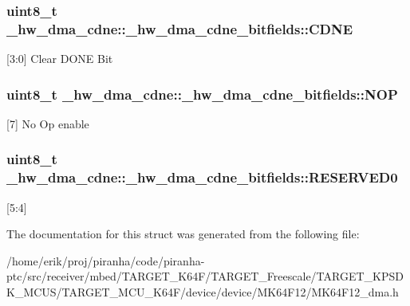 \subsubsection[{\texorpdfstring{C\+D\+NE}{CDNE}}]{\setlength{\rightskip}{0pt plus 5cm}uint8\+\_\+t \+\_\+hw\+\_\+dma\+\_\+cdne\+::\+\_\+hw\+\_\+dma\+\_\+cdne\+\_\+bitfields\+::\+C\+D\+NE}\hypertarget{struct__hw__dma__cdne_1_1__hw__dma__cdne__bitfields_ab1ddbdeb8e607e1e1ff8afd236c93c61}{}\label{struct__hw__dma__cdne_1_1__hw__dma__cdne__bitfields_ab1ddbdeb8e607e1e1ff8afd236c93c61}
\mbox{[}3\+:0\mbox{]} Clear D\+O\+NE Bit 
\subsubsection[{\texorpdfstring{N\+OP}{NOP}}]{\setlength{\rightskip}{0pt plus 5cm}uint8\+\_\+t \+\_\+hw\+\_\+dma\+\_\+cdne\+::\+\_\+hw\+\_\+dma\+\_\+cdne\+\_\+bitfields\+::\+N\+OP}\hypertarget{struct__hw__dma__cdne_1_1__hw__dma__cdne__bitfields_a2d0fc588f4e23aed9e119f61d7bb7bc4}{}\label{struct__hw__dma__cdne_1_1__hw__dma__cdne__bitfields_a2d0fc588f4e23aed9e119f61d7bb7bc4}
\mbox{[}7\mbox{]} No Op enable 
\subsubsection[{\texorpdfstring{R\+E\+S\+E\+R\+V\+E\+D0}{RESERVED0}}]{\setlength{\rightskip}{0pt plus 5cm}uint8\+\_\+t \+\_\+hw\+\_\+dma\+\_\+cdne\+::\+\_\+hw\+\_\+dma\+\_\+cdne\+\_\+bitfields\+::\+R\+E\+S\+E\+R\+V\+E\+D0}\hypertarget{struct__hw__dma__cdne_1_1__hw__dma__cdne__bitfields_a099d2094bffd7a7e67393683434dcc49}{}\label{struct__hw__dma__cdne_1_1__hw__dma__cdne__bitfields_a099d2094bffd7a7e67393683434dcc49}
\mbox{[}5\+:4\mbox{]} 

The documentation for this struct was generated from the following file\+:\begin{DoxyCompactItemize}
\item 
/home/erik/proj/piranha/code/piranha-\/ptc/src/receiver/mbed/\+T\+A\+R\+G\+E\+T\+\_\+\+K64\+F/\+T\+A\+R\+G\+E\+T\+\_\+\+Freescale/\+T\+A\+R\+G\+E\+T\+\_\+\+K\+P\+S\+D\+K\+\_\+\+M\+C\+U\+S/\+T\+A\+R\+G\+E\+T\+\_\+\+M\+C\+U\+\_\+\+K64\+F/device/device/\+M\+K64\+F12/M\+K64\+F12\+\_\+dma.\+h\end{DoxyCompactItemize}
